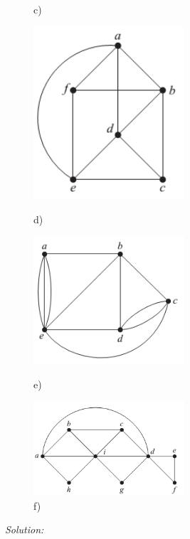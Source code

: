 \documentclass[a4paper]{article}
\begin{document}
\begin{figure}[H]
\begin{minipage}{0.5\textwidth}
			\caption*{c)}
		\end{minipage}
		\begin{minipage}{0.5\textwidth}
			\centering
			\includegraphics[width=0.5\textwidth]{tut912_4.png}
			\caption*{d)}
		\end{minipage}
		\begin{minipage}{0.5\textwidth}
			\centering
			\includegraphics[width=0.5\textwidth]{tut912_5.png}
			\caption*{e)}
		\end{minipage}
		\begin{minipage}{0.5\textwidth}
			\centering
			\includegraphics[width=0.5\textwidth]{tut912_6.png}
			\caption*{f)}
		\end{minipage}
	\end{figure}
	\emph{Solution:} 
\end{document}
